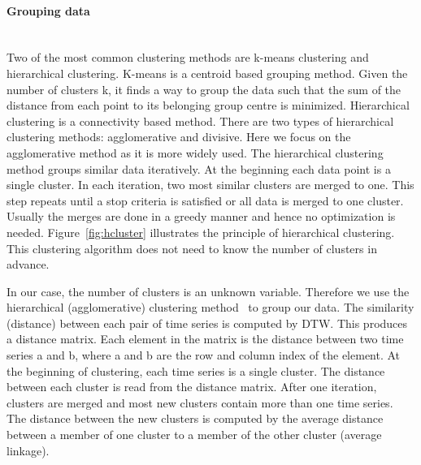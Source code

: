 \paragraph{Grouping data} ~\\
Two of the most common clustering methods are k-means clustering and hierarchical clustering. K-means is a centroid based grouping method. Given the number of clusters k, it finds a way to group the data such that the sum of the distance from each point to its belonging group centre is minimized. Hierarchical clustering is a connectivity based method. There are two types of hierarchical clustering methods: agglomerative and divisive. Here we focus on the agglomerative method as it is more widely used. The hierarchical clustering method groups similar data iteratively. At the beginning each data point is a single cluster. In each iteration, two most similar clusters are merged to one. This step repeats until a stop criteria is satisfied or all data is merged to one cluster. Usually the merges are done in a greedy manner and hence no optimization is needed. Figure~\ref{fig:hcluster} illustrates the principle of hierarchical clustering. This clustering algorithm does not need to know the number of clusters in advance.

In our case, the number of clusters is an unknown variable. Therefore we use the hierarchical (agglomerative) clustering method~\cite{willett1988recent} to group our data. The similarity (distance) between each pair of time series is computed by DTW. This produces a distance matrix. Each element in the matrix is the distance between two time series a and b, where a and b are the row and column index of the element. At the beginning of clustering, each time series is a single cluster. The distance between each cluster is read from the distance matrix. After one iteration, clusters are merged and most new clusters contain more than one time series. The distance between the new clusters is computed by the average distance between a member of one cluster to a member of the other cluster (average linkage).

